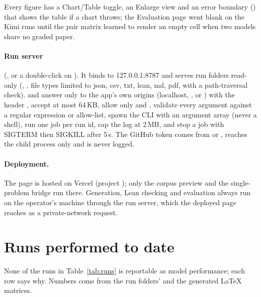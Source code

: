 \documentclass[11pt,a4paper]{article}
\begin{document}
Every figure has a Chart/Table toggle, an Enlarge view and an error boundary () that shows the table if a chart throws; the Evaluation page went blank on the Kimi runs until the pair matrix learned to render an empty cell when two models share no graded paper.

\paragraph{Run server} (, or a double-click on ). It binds to 127.0.0.1:8787 and serves run folders read-only (, , file types limited to json, csv, txt, lean, md, pdf, with a path-traversal check).  and  answer only to the app's own origins (localhost, , or ) with the header , accept at most 64\,KB, allow only  and , validate every argument against a regular expression or allow-list, spawn the CLI with an argument array (never a shell), run one job per run id, cap the log at 2\,MB, and stop a job with SIGTERM then SIGKILL after 5\,s. The GitHub token comes from  or , reaches the child process only and is never logged.

\paragraph{Deployment.} The page is hosted on Vercel (project ); only the corpus preview and the single-problem bridge run there. Generation, Lean checking and evaluation always run on the operator's machine through the run server, which the deployed page reaches as a private-network request.

\section{Runs performed to date}
\label{sec:runs}

None of the runs in Table~\ref{tab:runs} is reportable as model performance; each row says why. Numbers come from the run folders'  and the generated LaTeX matrices.
\end{document}

